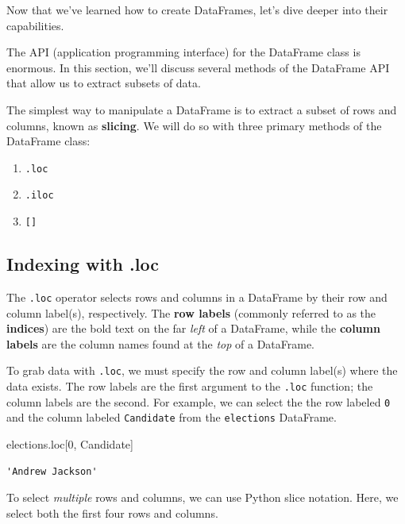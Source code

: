 \documentclass[
  letterpaper,
  DIV=11,
  numbers=noendperiod]{scrreprt}
\newenvironment{Shaded}{\begin{snugshade}}{\end{snugshade}}
\newcommand{\DecValTok}[1]{\textcolor[rgb]{0.68,0.00,0.00}{#1}}
\newcommand{\NormalTok}[1]{\textcolor[rgb]{0.00,0.23,0.31}{#1}}
\newcommand{\StringTok}[1]{\textcolor[rgb]{0.13,0.47,0.30}{#1}}
\providecommand{\tightlist}{%
  \setlength{\itemsep}{0pt}\setlength{\parskip}{0pt}}\usepackage{longtable,booktabs,array}
\begin{document}
Now that we've learned how to create DataFrames, let's dive deeper into
their capabilities.

The API (application programming interface) for the DataFrame class is
enormous. In this section, we'll discuss several methods of the
DataFrame API that allow us to extract subsets of data.

The simplest way to manipulate a DataFrame is to extract a subset of
rows and columns, known as \textbf{slicing}. We will do so with three
primary methods of the DataFrame class:

\begin{enumerate}
\def\labelenumi{\arabic{enumi}.}
\tightlist
\item
  \texttt{.loc}
\item
  \texttt{.iloc}
\item
  \texttt{{[}{]}}
\end{enumerate}

\hypertarget{indexing-with-.loc}{%
\subsection{Indexing with .loc}\label{indexing-with-.loc}}

The \texttt{.loc} operator selects rows and columns in a DataFrame by
their row and column label(s), respectively. The \textbf{row labels}
(commonly referred to as the \textbf{indices}) are the bold text on the
far \emph{left} of a DataFrame, while the \textbf{column labels} are the
column names found at the \emph{top} of a DataFrame.

To grab data with \texttt{.loc}, we must specify the row and column
label(s) where the data exists. The row labels are the first argument to
the \texttt{.loc} function; the column labels are the second. For
example, we can select the the row labeled \texttt{0} and the column
labeled \texttt{Candidate} from the \texttt{elections} DataFrame.

\begin{Shaded}
\begin{Highlighting}[]
\NormalTok{elections.loc[}\DecValTok{0}\NormalTok{, }\StringTok{\textquotesingle{}Candidate\textquotesingle{}}\NormalTok{]}
\end{Highlighting}
\end{Shaded}

\begin{verbatim}
'Andrew Jackson'
\end{verbatim}

To select \emph{multiple} rows and columns, we can use Python slice
notation. Here, we select both the first four rows and columns.
\end{document}
